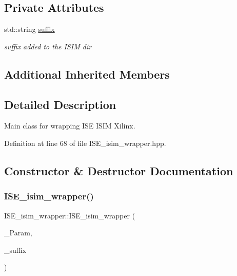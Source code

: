 \subsection*{Private Attributes}
\begin{DoxyCompactItemize}
\item 
std\+::string \hyperlink{classISE__isim__wrapper_a372513ac46467fd73931d3798ad75e1b}{suffix}
\begin{DoxyCompactList}\small\item\em suffix added to the I\+S\+IM dir \end{DoxyCompactList}\end{DoxyCompactItemize}
\subsection*{Additional Inherited Members}


\subsection{Detailed Description}
Main class for wrapping I\+SE I\+S\+IM Xilinx. 

Definition at line 68 of file I\+S\+E\+\_\+isim\+\_\+wrapper.\+hpp.



\subsection{Constructor \& Destructor Documentation}
\mbox{\label{classISE__isim__wrapper_a7a45e55d837ba7c7c24cc7db77bc529c}} 
\subsubsection{\texorpdfstring{I\+S\+E\+\_\+isim\+\_\+wrapper()}{ISE\_isim\_wrapper()}}
{\footnotesize\ttfamily I\+S\+E\+\_\+isim\+\_\+wrapper\+::\+I\+S\+E\+\_\+isim\+\_\+wrapper (\begin{DoxyParamCaption}\item[{const \hyperlink{Parameter_8hpp_a37841774a6fcb479b597fdf8955eb4ea}{Parameter\+Const\+Ref} \&}]{\+\_\+\+Param,  }\item[{std\+::string}]{\+\_\+suffix }\end{DoxyParamCaption})}



